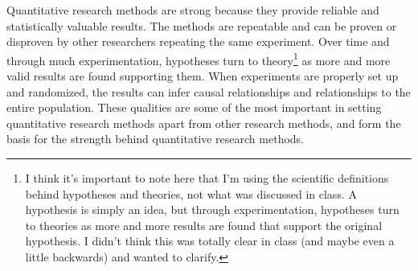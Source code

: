 \documentclass[12pt]{article}
\begin{document}
Quantitative research methods are strong because they provide reliable and statistically valuable results. The methods are repeatable and can be proven or disproven by other researchers repeating the same experiment. Over time and through much experimentation, hypotheses turn to theory\footnote{I think it's important to note here that I'm using the scientific definitions behind hypotheses and theories, not what was discussed in class. A hypothesis is simply an idea, but through experimentation, hypotheses turn to theories as more and more results are found that support the original hypothesis. I didn't think this was totally clear in class (and maybe even a little backwards) and wanted to clarify.} as more and more valid results are found supporting them. When experiments are properly set up and randomized, the results can infer causal relationships and relationships to the entire population. These qualities are some of the most important in setting quantitative research methods apart from other research methods, and form the basis for the strength behind quantitative research methods.
\end{document}
